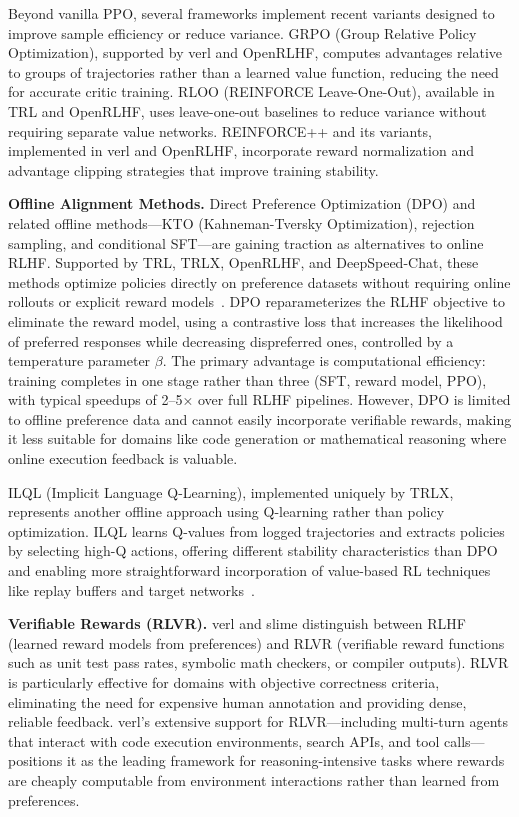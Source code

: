 \documentclass[conference]{IEEEtran}
\begin{document}
Beyond vanilla PPO, several frameworks implement recent variants designed to improve sample efficiency or reduce variance. GRPO (Group Relative Policy Optimization), supported by verl and OpenRLHF, computes advantages relative to groups of trajectories rather than a learned value function, reducing the need for accurate critic training. RLOO (REINFORCE Leave-One-Out), available in TRL and OpenRLHF, uses leave-one-out baselines to reduce variance without requiring separate value networks. REINFORCE++ and its variants, implemented in verl and OpenRLHF, incorporate reward normalization and advantage clipping strategies that improve training stability.

\textbf{Offline Alignment Methods.} Direct Preference Optimization (DPO) and related offline methods—KTO (Kahneman-Tversky Optimization), rejection sampling, and conditional SFT—are gaining traction as alternatives to online RLHF. Supported by TRL, TRLX, OpenRLHF, and DeepSpeed-Chat, these methods optimize policies directly on preference datasets without requiring online rollouts or explicit reward models~\cite{dpo-paper}. DPO reparameterizes the RLHF objective to eliminate the reward model, using a contrastive loss that increases the likelihood of preferred responses while decreasing dispreferred ones, controlled by a temperature parameter $\beta$. The primary advantage is computational efficiency: training completes in one stage rather than three (SFT, reward model, PPO), with typical speedups of 2–5× over full RLHF pipelines. However, DPO is limited to offline preference data and cannot easily incorporate verifiable rewards, making it less suitable for domains like code generation or mathematical reasoning where online execution feedback is valuable.

ILQL (Implicit Language Q-Learning), implemented uniquely by TRLX, represents another offline approach using Q-learning rather than policy optimization. ILQL learns Q-values from logged trajectories and extracts policies by selecting high-Q actions, offering different stability characteristics than DPO and enabling more straightforward incorporation of value-based RL techniques like replay buffers and target networks~\cite{ilql-paper}.

\textbf{Verifiable Rewards (RLVR).} verl and slime distinguish between RLHF (learned reward models from preferences) and RLVR (verifiable reward functions such as unit test pass rates, symbolic math checkers, or compiler outputs). RLVR is particularly effective for domains with objective correctness criteria, eliminating the need for expensive human annotation and providing dense, reliable feedback. verl's extensive support for RLVR—including multi-turn agents that interact with code execution environments, search APIs, and tool calls—positions it as the leading framework for reasoning-intensive tasks where rewards are cheaply computable from environment interactions rather than learned from preferences.
\end{document}
